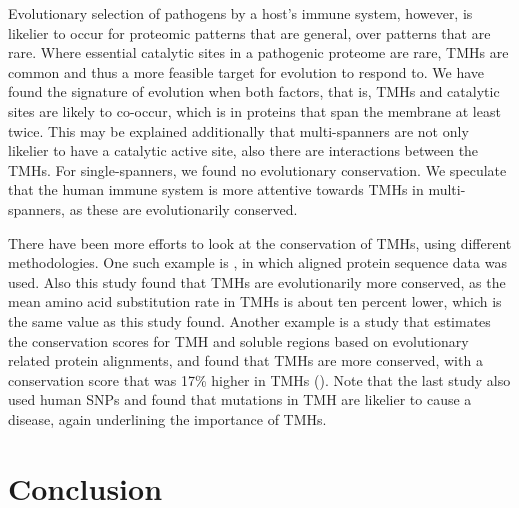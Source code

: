 
Evolutionary selection of pathogens by a host's immune system,
however, is likelier to occur for proteomic patterns that are general,
over patterns that are rare.
Where essential catalytic sites in a pathogenic proteome
are rare, TMHs are common and thus a more feasible 
target for evolution to respond to.
We have found the signature of evolution when both factors,
that is, TMHs and catalytic sites are likely to co-occur,
which is in proteins that span the membrane at least twice.
This may be explained additionally that multi-spanners
are not only likelier to have a catalytic active site,
also there are interactions between the TMHs.
For single-spanners, we found no evolutionary conservation.
We speculate that the human immune system is more attentive 
towards TMHs in multi-spanners, as these are evolutionarily conserved.

There have been more efforts to look at the conservation of TMHs,
using different methodologies.
One such example is \cite{stevens2001substitution}, 
in which aligned protein sequence data was used.
Also this study found that TMHs are evolutionarily more conserved,
as the mean amino acid substitution rate in TMHs is about ten
percent lower,
which is the same value as this study found.
Another example is a study that estimates the conservation
scores for TMH and soluble regions based on 
evolutionary related protein alignments,
and found that TMHs are more conserved, 
with a conservation score that was 17\% higher in 
TMHs (\cite{oberai2009structural}).
Note that the last study also used human SNPs
and found that mutations in TMH are likelier to cause
a disease, again underlining the importance of TMHs.

\section{Conclusion}


